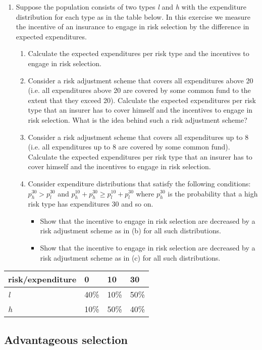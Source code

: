 \documentclass[a4paper]{article}
\begin{document}
\begin{enumerate}[resume]
\item Suppose the population consists of two types \emph{l} and \emph{h} with the expenditure distribution for each type as in the table below. In this exercise we measure the incentive of an insurance to engage in risk selection by the difference in expected expenditures.
\begin{enumerate}
\item Calculate the expected expenditures per risk type and the incentives to engage in risk selection.
\item Consider a risk adjustment scheme that covers all expenditures above 20 (i.e. all expenditures above 20 are covered by some common fund to the extent that they exceed 20). Calculate the expected expenditures per risk type that an insurer has to cover himself and the incentives to engage in risk selection. What is the idea behind such a risk adjustment scheme?
\item Consider a risk adjustment scheme that covers all expenditures up to 8 (i.e. all expenditures up to 8 are covered by some common fund). Calculate the expected expenditures per risk type that an insurer has to cover himself and the incentives to engage in risk selection.
\item Consider expenditure distributions that satisfy the following conditions: \(p_h^{30}>p_l^{30}\) and \(p_h^{10}+p_h^{30}\geq p_l^{10}+p_l^{30}\) where \(p_h^{30}\) is the probability that a high risk type has expenditures 30 and so on. 
\begin{itemize}
\item Show that the  incentive to engage in risk selection are decreased by a risk adjustment scheme as in (b) for all such distributions.
\item Show that the  incentive to engage in risk selection are decreased by a risk adjustment scheme as in (c) for all such distributions.
\end{itemize}
\end{enumerate}
\end{enumerate}

\begin{center}
\begin{tabular}{l|lll}
risk/expenditure & 0 & 10 & 30\\
\hline
\emph{l} & 40\% & 10\% & 50\%\\
\emph{h} & 10\% & 50\% & 40\%\\
\end{tabular}
\end{center}
\subsection{Advantageous selection}
\label{sec:orgc9842fb}
\end{document}
